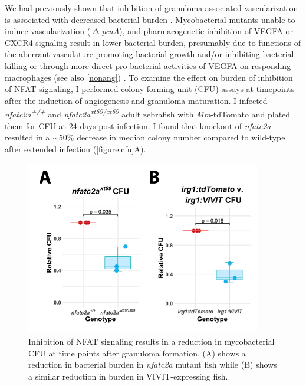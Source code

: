 We had previously shown that inhibition of granuloma\hyp{}associated vascularization is associated with decreased bacterial burden \citep{Oehlers2015}. Mycobacterial mutants unable to induce vascularization ($\upDelta$\textit{pcaA}), and pharmacogenetic inhibition of VEGFA or CXCR4 signaling result in lower bacterial burden, presumably due to functions of the aberrant vasculature promoting bacterial growth and/or inhibiting bacterial killing \citep{Rao2005, Glickman2000, Oehlers2015, Walton2018} or through more direct pro\hyp{}bacterial activities of VEGFA on responding macrophages (see also \autoref{nonang}) \citep{Harding2019}. To examine the effect on burden of inhibition of NFAT signaling, I performed colony forming unit (CFU) assays at timepoints after the induction of angiogenesis and granuloma maturation. I infected \textit{nfatc2a\textsuperscript{+/+}} and \textit{nfatc2a\textsuperscript{xt69/xt69}} adult zebrafish with \textit{Mm}\hyp{}tdTomato and plated them for CFU at 24 days post infection. I found that knockout of \textit{nfatc2a} resulted in a ${\sim}$50\% decrease in median colony number compared to wild\hyp{}type after extended infection (\autoref{figure:cfu}A). 

\begin{figure}
\centering
\includegraphics[height=3in]{images/cfu.pdf}
\caption[NFAT inhibition decreases bacterial burden]{Inhibition of NFAT signaling results in a reduction in mycobacterial CFU at time points after granuloma formation. (A) shows a reduction in bacterial burden in \textit{nfatc2a} mutant fish while (B) shows a similar reduction in burden in VIVIT\hyp{}expressing fish.}
\label{figure:cfu}

\end{figure}

